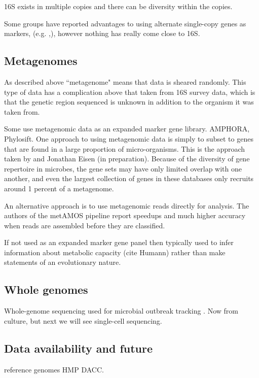 \documentclass{amsart}
\begin{document}
16S exists in multiple copies and there can be diversity within the copies.
\citet{kembel2012incorporating}

Some groups have reported advantages to using alternate single-copy genes as markers, (e.g. \cite{case2007rpob},\cite{mcnabb2004hsp65}), however nothing has really come close to 16S.


\subsection{Metagenomes}

As described above ``metagenome" means that data is sheared randomly.
This type of data has a complication above that taken from 16S survey data, which is that the genetic region sequenced is unknown in addition to the organism it was taken from.

Some use metagenomic data as an expanded marker gene library.
\cite{kembel2011phylogenetic}
AMPHORA, Phylosift.
One approach to using metagenomic data is simply to subset to genes that are found in a large proportion of micro-organisms.
This is the approach taken by \citep{von2007quantitative,stark2010mltreemap} and Jonathan Eisen \citep{wu2008amphora} (in preparation).
Because of the diversity of gene repertoire in microbes, the gene sets may have only limited overlap with one another, and even the largest collection of genes in these databases only recruits around 1 percent of a metagenome.

An alternative approach is to use metagenomic reads directly for analysis.
The authors of the metAMOS pipeline \cite{treangen2013metamos} report speedups and much higher accuracy when reads are assembled before they are classified.

If not used as an expanded marker gene panel then typically used to infer information about metabolic capacity (cite Humann) rather than make statements of an evolutionary nature.


\subsection{Whole genomes}
Whole-genome sequencing used for microbial outbreak tracking \cite{snitkin2012tracking}.
Now from culture, but next we will see single-cell sequencing.


\subsection{Data availability and future}
reference genomes
HMP DACC.
\end{document}
